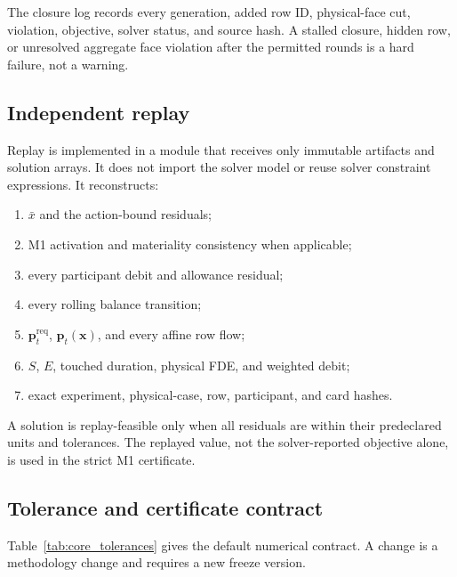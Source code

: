 \documentclass[10pt,journal,onecolumn]{IEEEtran}
\begin{document}
The closure log records every generation, added row ID, physical-face cut,
violation, objective, solver status, and source hash. A stalled closure, hidden
row, or unresolved aggregate face violation after the permitted rounds is a
hard failure, not a warning.

\subsection{Independent replay}

Replay is implemented in a module that receives only immutable artifacts and
solution arrays. It does not import the solver model or reuse solver
constraint expressions. It reconstructs:
\begin{enumerate}[leftmargin=*,itemsep=2pt]
\item $\bar x$ and the action-bound residuals;
\item M1 activation and materiality consistency when applicable;
\item every participant debit and allowance residual;
\item every rolling balance transition;
\item $\bm p_t^{\mathrm{req}}$, $\bm p_t(\bm x)$, and every affine row flow;
\item $S$, $E$, touched duration, physical FDE, and weighted debit;
\item exact experiment, physical-case, row, participant, and card hashes.
\end{enumerate}
A solution is replay-feasible only when all residuals are within their
predeclared units and tolerances. The replayed value, not the solver-reported
objective alone, is used in the strict M1 certificate.

\subsection{Tolerance and certificate contract}

Table~\ref{tab:core_tolerances} gives the default numerical contract. A change
is a methodology change and requires a new freeze version.
\end{document}
